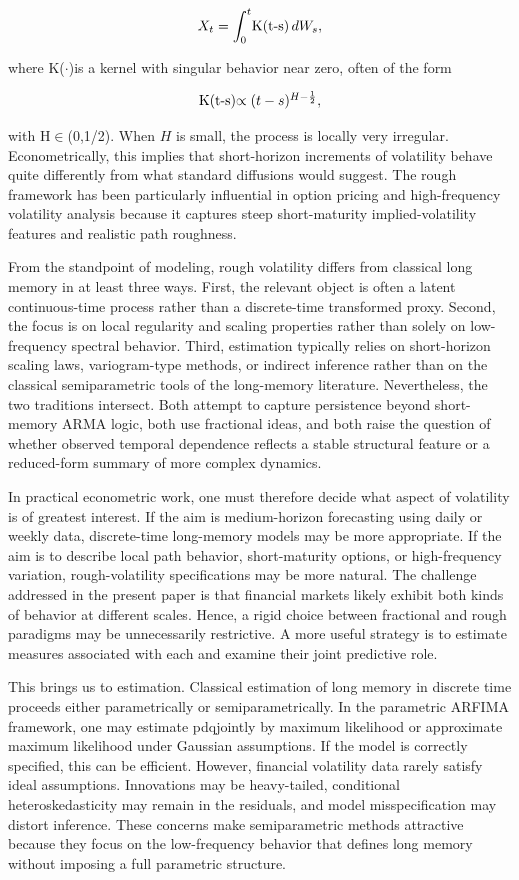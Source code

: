 \documentclass[12pt]{article}
\begin{document}
\[X_t = \int_0^t $K(t-s)$\,dW_s,\]

where K($\cdot$)is a kernel with singular behavior near zero, often of the form

\[$K(t-s)$ \propto (t-s)^{H-\frac{1}{2}},\]

with H$\in$(0,1/2). When $H$ is small, the process is locally very irregular. Econometrically, this implies that short-horizon increments of volatility behave quite differently from what standard diffusions would suggest. The rough framework has been particularly influential in option pricing and high-frequency volatility analysis because it captures steep short-maturity implied-volatility features and realistic path roughness.

From the standpoint of modeling, rough volatility differs from classical long memory in at least three ways. First, the relevant object is often a latent continuous-time process rather than a discrete-time transformed proxy. Second, the focus is on local regularity and scaling properties rather than solely on low-frequency spectral behavior. Third, estimation typically relies on short-horizon scaling laws, variogram-type methods, or indirect inference rather than on the classical semiparametric tools of the long-memory literature. Nevertheless, the two traditions intersect. Both attempt to capture persistence beyond short-memory ARMA logic, both use fractional ideas, and both raise the question of whether observed temporal dependence reflects a stable structural feature or a reduced-form summary of more complex dynamics.

In practical econometric work, one must therefore decide what aspect of volatility is of greatest interest. If the aim is medium-horizon forecasting using daily or weekly data, discrete-time long-memory models may be more appropriate. If the aim is to describe local path behavior, short-maturity options, or high-frequency variation, rough-volatility specifications may be more natural. The challenge addressed in the present paper is that financial markets likely exhibit both kinds of behavior at different scales. Hence, a rigid choice between fractional and rough paradigms may be unnecessarily restrictive. A more useful strategy is to estimate measures associated with each and examine their joint predictive role.

This brings us to estimation. Classical estimation of long memory in discrete time proceeds either parametrically or semiparametrically. In the parametric ARFIMA framework, one may estimate pdqjointly by maximum likelihood or approximate maximum likelihood under Gaussian assumptions. If the model is correctly specified, this can be efficient. However, financial volatility data rarely satisfy ideal assumptions. Innovations may be heavy-tailed, conditional heteroskedasticity may remain in the residuals, and model misspecification may distort inference. These concerns make semiparametric methods attractive because they focus on the low-frequency behavior that defines long memory without imposing a full parametric structure.
\end{document}
